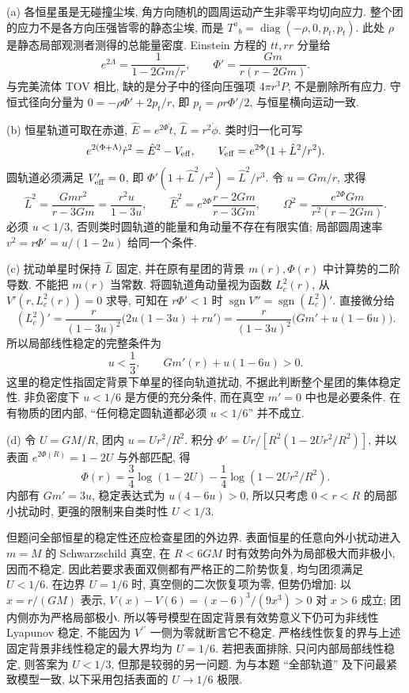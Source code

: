 \begin{solution}
(a) 各恒星虽是无碰撞尘埃, 角方向随机的圆周运动产生非零平均切向应力. 整个团的应力不是各方向压强皆零的静态尘埃, 而是 $T^a{}_b=\operatorname{diag}(-\rho,0,p_t,p_t)$. 此处 $\rho$ 是静态局部观测者测得的总能量密度. Einstein 方程的 $tt,rr$ 分量给
\[
e^{2\Lambda}=\frac1{1-2Gm/r},\qquad
\Phi'=\frac{Gm}{r(r-2Gm)}.
\]
与完美流体 TOV 相比, 缺的是分子中的径向压强项 $4\pi r^3P$, 不是删除所有应力. 守恒式径向分量为 $0=-\rho\Phi'+2p_t/r$, 即 $p_t=\rho r\Phi'/2$, 与恒星横向运动一致.

(b) 恒星轨道可取在赤道, $\hat E=e^{2\Phi}\dot t$, $\hat L=r^2\dot\phi$. 类时归一化可写
\[
e^{2(\Phi+\Lambda)}\dot r^2=\hat E^2-V_{\rm eff},\qquad
V_{\rm eff}=e^{2\Phi}(1+\hat L^2/r^2).
\]
圆轨道必须满足 $V'_{\rm eff}=0$, 即 $\Phi'(1+\hat L^2/r^2)=\hat L^2/r^3$. 令 $u=Gm/r$, 求得
\[
\hat L^2=\frac{Gmr^2}{r-3Gm}=\frac{r^2u}{1-3u},\qquad
\hat E^2=e^{2\Phi}\frac{r-2Gm}{r-3Gm},\qquad
\Omega^2=\frac{e^{2\Phi}Gm}{r^2(r-2Gm)}.
\]
必须 $u<1/3$, 否则类时圆轨道的能量和角动量不存在有限实值; 局部圆周速率 $v^2=r\Phi'=u/(1-2u)$ 给同一个条件.

(c) 扰动单星时保持 $\hat L$ 固定, 并在原有星团的背景 $m(r),\Phi(r)$ 中计算势的二阶导数. 不能把 $m(r)$ 当常数. 将圆轨道角动量视为函数 $L_c^2(r)$, 从 $V'(r,L_c^2(r))=0$ 求导, 可知在 $r\Phi'<1$ 时 $\operatorname{sgn}V''=\operatorname{sgn}(L_c^2)'$. 直接微分给
\[
(L_c^2)'=\frac{r}{(1-3u)^2}\bigl(2u(1-3u)+ru'\bigr)
=\frac{r}{(1-3u)^2}\bigl(Gm'+u(1-6u)\bigr).
\]
所以局部线性稳定的完整条件为
\[
u<\frac13,\qquad Gm'(r)+u(1-6u)>0.
\]
这里的稳定性指固定背景下单星的径向轨道扰动, 不据此判断整个星团的集体稳定性. 非负密度下 $u<1/6$ 是方便的充分条件, 而在真空 $m'=0$ 中也是必要条件. 在有物质的团内部, ``任何稳定圆轨道都必须 $u<1/6$'' 并不成立.

(d) 令 $U=GM/R$, 团内 $u=U r^2/R^2$. 积分 $\Phi'=Ur/[R^2(1-2Ur^2/R^2)]$, 并以表面 $e^{2\Phi(R)}=1-2U$ 与外部匹配, 得
\[
\Phi(r)=\frac34\log(1-2U)-\frac14\log(1-2Ur^2/R^2).
\]
内部有 $Gm'=3u$, 稳定表达式为 $u(4-6u)>0$, 所以只考虑 $0<r<R$ 的局部小扰动时, 更强的限制来自类时性 $U<1/3$.

但题问全部恒星的稳定性还应检查星团的外边界. 表面恒星的任意向外小扰动进入 $m=M$ 的 Schwarzschild 真空, 在 $R<6GM$ 时有效势向外为局部极大而非极小, 因而不稳定. 因此若要求表面双侧都有严格正的二阶势恢复, 均匀团须满足 $U<1/6$. 在边界 $U=1/6$ 时, 真空侧的二次恢复项为零, 但势仍增加: 以 $x=r/(GM)$ 表示, $V(x)-V(6)=(x-6)^3/(9x^3)>0$ 对 $x>6$ 成立; 团内侧亦为严格局部极小. 所以等号模型在固定背景有效势意义下仍可为非线性 Lyapunov 稳定, 不能因为 $V^{\prime\prime}$ 一侧为零就断言它不稳定. 严格线性恢复的界与上述固定背景非线性稳定的最大界均为 $U=1/6$. 若把表面排除, 只问内部局部线性稳定, 则答案为 $U<1/3$, 但那是较弱的另一问题. 为与本题 ``全部轨道'' 及下问最紧致模型一致, 以下采用包括表面的 $U\to1/6$ 极限.


\end{solution}
